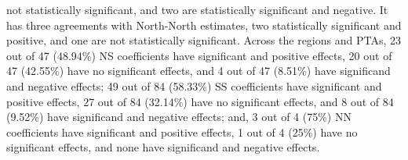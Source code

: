 not statistically significant, and two are statistically significant and
negative. It has three agreements with North-North estimates, two
statistically significant and positive, and one are not statistically
significant. Across the regions and PTAs, 23 out of 47 (48.94\%) NS
coefficients have significant and positive effects, 20 out of 47
(42.55\%) have no significant effects, and 4 out of 47 (8.51\%) have
significand and negative effects; 49 out of 84 (58.33\%) SS coefficients
have significant and positive effects, 27 out of 84 (32.14\%) have no
significant effects, and 8 out of 84 (9.52\%) have significand and
negative effects; and, 3 out of 4 (75\%) NN coefficients have
significant and positive effects, 1 out of 4 (25\%) have no significant
effects, and none have significand and negative effects.

